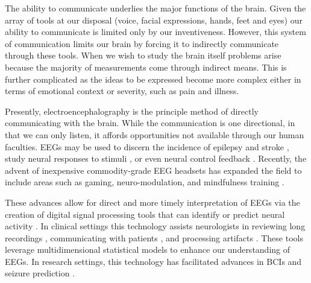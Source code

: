


The ability to communicate underlies the major functions of the brain. Given the array of tools at our disposal (voice, facial expressions, hands, feet and eyes) our ability to communicate is limited only by our inventiveness. However, this system of communication limits our brain by forcing it to indirectly communicate through these tools. When we wish to study the brain itself problems arise because the majority of measurements come through indirect means. This is further complicated as the ideas to be expressed become more complex either in terms of emotional context or severity, such as pain and illness.

Presently, electroencephalography is the principle method of directly communicating with the brain. While the communication is one directional, in that we can only listen, it affords opportunities not available through our human faculties. \acp{EEG} may be used to discern the incidence of epilepsy and stroke \cite{Markand2003}, study neural responses to stimuli \cite{Picton1992}, or even neural control feedback \cite{Khanna2016}. Recently, the advent of inexpensive commodity-grade \ac{EEG} headsets \cite{Liao2012} has expanded the field to include areas such as gaming, neuro-modulation, and mindfulness training \cite{Lance2012}.

These advances allow for direct and more timely interpretation of \acp{EEG} via the creation of digital signal processing tools that can identify or predict neural activity \cite{Ramgopal2014}. In clinical settings this technology assists neurologists in reviewing long recordings \cite{Lopez2015}, communicating with patients \cite{Picton1992}, and processing artifacts \cite{Nolan2010}. These tools leverage multidimensional statistical models \cite{Schulz2012, Kannathal2005, Lawhern2016} to enhance our understanding of \acp{EEG}. In research settings, this technology has facilitated advances in \acp{BCI} \cite{Lotte2010b} and seizure prediction \cite{Chu2017}.

